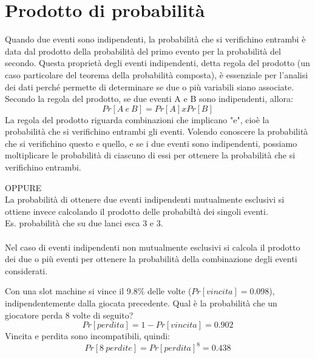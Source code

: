 \documentclass[drafts, 10pt]{book}
\newcounter{example}[section]
\begin{document}
\section{Prodotto di probabilità\label{secprodottodiprobabilità}}
Quando due eventi sono indipendenti, la probabilità che si verifichino entrambi è data dal prodotto della probabilità del primo evento per la probabilità del secondo. Questa proprietà degli eventi indipendenti, detta regola del prodotto (un caso particolare del teorema della probabilità composta), è essenziale per l'analisi dei dati perché permette di determinare se due o più variabili siano associate.
\\
Secondo la regola del prodotto, se due eventi A e B sono indipendenti, allora:
\begin{equation}
    Pr[A\ e\ B] = Pr[A] x Pr[B] 
\end{equation}
La regola del prodotto riguarda combinazioni che implicano "e", cioè la probabilità che si verifichino entrambi gli eventi. Volendo conoscere la probabilità che si verifichino questo e quello, e se i due eventi sono indipendenti, possiamo moltiplicare le probabilità di ciascuno di essi per ottenere la probabilità che si verifichino entrambi.
\\
\colorbox{lyellow}{\parbox{\textwidth}{OPPURE
\\
La probabilità di ottenere due eventi indipendenti mutualmente esclusivi si ottiene invece calcolando il prodotto delle probabiltà dei singoli eventi.
\\
Es. probabilità che su due lanci esca 3 e 3.
\\
\\
Nel caso di eventi indipendenti non mutualmente esclusivi si calcola il prodotto dei due o più eventi per ottenere la probabilità della combinazione degli eventi considerati.}}
\begin{example}
    Con una slot machine si vince il 9.8\% delle volte ($Pr[vincita] = 0.098$), indipendentemente dalla giocata precedente.
    Qual è la probabilità che un giocatore perda 8 volte di seguito?
    \begin{equation}
        Pr[perdita] = 1 - Pr[vincita] = 0.902
    \end{equation}
    Vincita e perdita sono incompatibili, quindi:
    \begin{equation}
        Pr[8\ perdite] = Pr[perdita]^8 = 0.438
    \end{equation}
\end{example}
\end{document}
